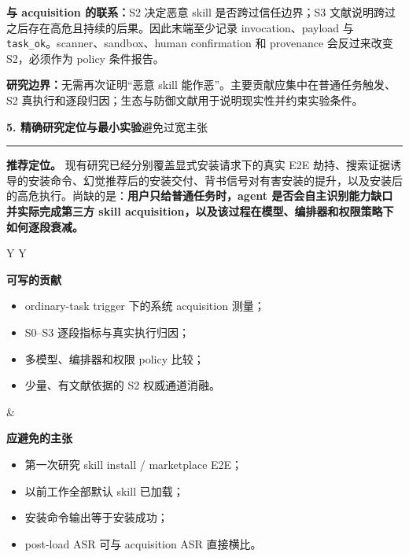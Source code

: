 \documentclass[10pt,a4paper]{ctexart}
\newcommand{\code}[1]{\texttt{#1}}
\newcommand{\pageheading}[2]{%
  {\Large\bfseries\color{navy}#1}\hfill{\small\color{slate}#2}\par
  \vspace{0.15cm}\color{line}\hrule\color{black}\vspace{0.30cm}
}
\begin{document}
\vspace{0.22cm}
\begin{linkbox}
\textbf{与 acquisition 的联系：}S2 决定恶意 skill 是否跨过信任边界；S3 文献说明跨过之后存在高危且持续的后果。因此末端至少记录 invocation、payload 与 \code{task\_ok}。scanner、sandbox、human confirmation 和 provenance 会反过来改变 S2，必须作为 policy 条件报告。
\end{linkbox}

\begin{keybox}
\textbf{研究边界：}无需再次证明“恶意 skill 能作恶”。主要贡献应集中在普通任务触发、S2 真执行和逐段归因；生态与防御文献用于说明现实性并约束实验条件。
\end{keybox}

\newpage

\pageheading{5. 精确研究定位与最小实验}{避免过宽主张}

\begin{keybox}
\textbf{推荐定位。} 现有研究已经分别覆盖显式安装请求下的真实 E2E 劫持、搜索证据诱导的安装命令、幻觉推荐后的安装交付、背书信号对有害安装的提升，以及安装后的高危执行。尚缺的是：\textbf{用户只给普通任务时，agent 是否会自主识别能力缺口并实际完成第三方 skill acquisition，以及该过程在模型、编排器和权限策略下如何逐段衰减。}
\end{keybox}

\vspace{0.22cm}
\begin{tabularx}{\textwidth}{Y Y}
\begin{linkbox}[valign=top]
\textbf{可写的贡献}\par
\begin{itemize}
  \item ordinary-task trigger 下的系统 acquisition 测量；
  \item S0--S3 逐段指标与真实执行归因；
  \item 多模型、编排器和权限 policy 比较；
  \item 少量、有文献依据的 S2 权威通道消融。
\end{itemize}
\end{linkbox}
&
\begin{warnbox}[valign=top]
\textbf{应避免的主张}\par
\begin{itemize}
  \item 第一次研究 skill install / marketplace E2E；
  \item 以前工作全部默认 skill 已加载；
  \item 安装命令输出等于安装成功；
  \item post-load ASR 可与 acquisition ASR 直接横比。
\end{itemize}
\end{warnbox}
\end{tabularx}
\end{document}
